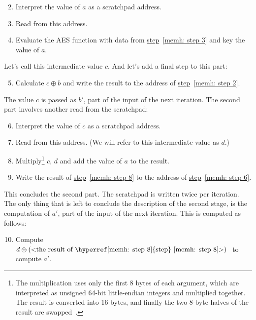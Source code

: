 \begin{enumerate}
  \setcounter{enumi}{1}
  \item \label{memh: step 2} Interpret the value of $a$ as a scratchpad address.
  \item \label{memh: step 3} Read from this address.
  \item Evaluate the AES function with data from \hyperref[memh: step 3]{step}~\ref{memh: step 3} and key the value of $a$.
\end{enumerate}
Let's call this intermediate value $c$. And let's add a final step to this part:
\begin{enumerate}
  \setcounter{enumi}{4}
  \item Calculate $c \oplus b$ and write the result to the address of \hyperref[memh: step 2]{step}~\ref{memh: step 2}.
\end{enumerate}
The value $c$ is passed as $b'$, part of the input of the next iteration. The second part involves another read from the scratchpad:

\begin{enumerate}
  \setcounter{enumi}{5}
  \item \label{memh: step 6} Interpret the value of $c$ as a scratchpad address.
  \item Read from this address. (We will refer to this intermediate value as $d$.)
  \item \label{memh: step 8} Multiply\footnote{The multiplication uses only the first 8 bytes of each argument, which are interpreted as unsigned 64-bit little-endian integers and multiplied together. The result is converted into 16 bytes, and finally the two 8-byte halves of the result are swapped~\cite{cryptonight}.} $c$, $d$ and add the value of $a$ to the result.
  \item Write the result of \hyperref[memh: step 8]{step}~\ref{memh: step 8} to the address of \hyperref[memh: step 6]{step}~\ref{memh: step 6}.
\end{enumerate}
This concludes the second part. The scratchpad is written twice per iteration. The only thing that is left to conclude the description of the second stage, is the computation of $a'$, part of the input of the next iteration. This is computed as follows:

\begin{enumerate}
  \setcounter{enumi}{9}
  \item Compute $d \oplus \mbox{(<the result of \hyperref[memh: step 8]{step}~\ref{memh: step 8}>) }$ to compute $a'$.
\end{enumerate}

